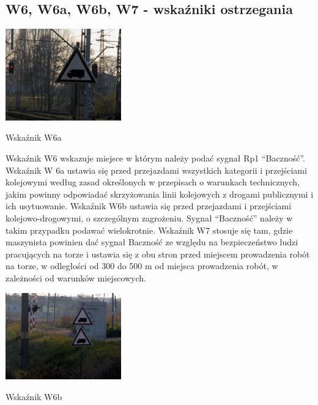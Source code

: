\subsection{W6, W6a, W6b, W7 - wskaźniki ostrzegania}
	\begin{marginfigure}
	\includegraphics[width=5cm]{skryptkierownik-img/skryptkierownik-img010.jpg}
	\caption{Wskaźnik W6a}
\end{marginfigure}
\begin{tcolorbox}[colback=black!5!white,colframe=white!55!black,title=Wskaźnik W6]
Wskaźnik W6 wskazuje miejsce w którym należy podać sygnał Rp1 “Baczność”. Wskaźnik W 6a ustawia się przed przejazdami wszystkich kategorii i przejściami kolejowymi według zasad określonych w przepisach o warunkach technicznych, jakim powinny odpowiadać skrzyżowania linii kolejowych z drogami publicznymi i ich usytuowanie. Wskaźnik W6b ustawia się przed przejazdami i przejściami kolejowo-drogowymi, o szczególnym zagrożeniu. Sygnał “Baczność” należy w takim przypadku podawać wielokrotnie. Wskaźnik W7 stosuje się tam, gdzie maszynista powinien dać sygnał {\textquotedbl}Baczność{\textquotedbl} ze względu na bezpieczeństwo ludzi pracujących na torze i ustawia się z obu stron przed miejscem prowadzenia robót na torze, w odległości od 300 do 500 m od miejsca prowadzenia robót, w zależności od warunków miejscowych.
\end{tcolorbox}
	\begin{marginfigure}
		\includegraphics[width=5cm]{skryptkierownik-img/skryptkierownik-img011.jpg}
		\caption{Wskaźnik W6b}
	\end{marginfigure}

